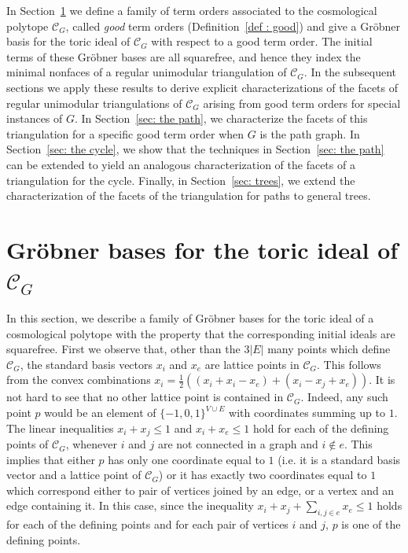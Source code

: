In Section~\ref{sec: grobner basis} we define a family of term orders associated to the cosmological polytope $\mathcal{C}_G$, called \emph{good} term orders (Definition~\ref{def : good}) and give a Gr\"obner basis for the toric ideal of $\mathcal{C}_G$ with respect to a good term order. 
The initial terms of these Gröbner bases are all squarefree, and hence they index the minimal nonfaces of a regular unimodular triangulation of $\mathcal{C}_G$.
In the subsequent sections we apply these results to derive explicit characterizations of the facets of regular unimodular triangulations of $\mathcal{C}_G$ arising from good term orders for special instances of $G$. 
In Section~\ref{sec: the path}, we characterize the facets of this triangulation for a specific good term order when $G$ is the path graph. 
In Section~\ref{sec: the cycle}, we show that the techniques in Section~\ref{sec: the path} can be extended to yield an analogous characterization of the facets of a triangulation for the cycle. 
Finally, in Section~\ref{sec: trees}, we extend the characterization of the facets of the triangulation for paths to general trees. 

\section{Gr\"obner bases for the toric ideal of \texorpdfstring{$\mathcal{C}_G$}{C\_G}}
\label{sec: grobner basis}
In this section, we describe a family of Gr\"{o}bner bases for the toric ideal of a cosmological polytope with the property that the corresponding initial ideals are squarefree. 
First we observe that, other than the $3|E|$ many points which define $\mathcal{C}_G$, the standard basis vectors $x_i$ and $x_e$ are lattice points in $\mathcal{C}_G$. This follows from the convex combinations $x_i=\frac{1}{2}((x_i+x_i-x_e)+(x_i-x_j+x_e))$. 
It is not hard to see that no other lattice point is contained in $\mathcal{C}_G$. Indeed, any such point $p$ would be an element of $\{-1,0,1\}^{V\cup E}$ with coordinates summing up to $1$. The linear inequalities $x_i+x_j\leq 1$ and $x_i+x_e\leq 1$ hold for each of the defining points of $\mathcal{C}_G$, whenever $i$ and $j$ are not connected in a graph and $i\notin e$. This implies that either $p$ has only one coordinate equal to $1$ (i.e. it is a standard basis vector and a lattice point of $\mathcal{C}_G$) or it has exactly two coordinates equal to $1$ which correspond either to pair of vertices joined by an edge, or a vertex and an edge containing it. In this case, since the inequality $x_i+x_j+\sum_{i,j\in e}x_e\leq 1$ holds for each of the defining points and for each pair of vertices $i$ and $j$, $p$ is one of the defining points.

